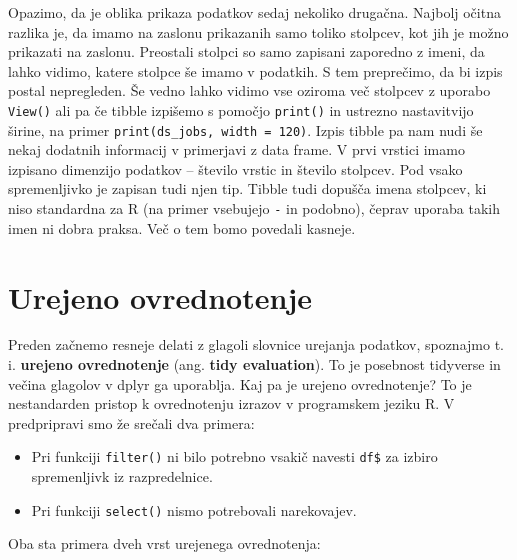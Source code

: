\documentclass[
]{book}
\providecommand{\tightlist}{%
  \setlength{\itemsep}{0pt}\setlength{\parskip}{0pt}}
\begin{document}
Opazimo, da je oblika prikaza podatkov sedaj nekoliko drugačna. Najbolj očitna razlika je, da imamo na zaslonu prikazanih samo toliko stolpcev, kot jih je možno prikazati na zaslonu. Preostali stolpci so samo zapisani zaporedno z imeni, da lahko vidimo, katere stolpce še imamo v podatkih. S tem preprečimo, da bi izpis postal nepregleden. Še vedno lahko vidimo vse oziroma več stolpcev z uporabo \texttt{View()} ali pa če tibble izpišemo s pomočjo \texttt{print()} in ustrezno nastavitvijo širine, na primer \texttt{print(ds\_jobs,\ width\ =\ 120)}. Izpis tibble pa nam nudi še nekaj dodatnih informacij v primerjavi z data frame. V prvi vrstici imamo izpisano dimenzijo podatkov -- število vrstic in število stolpcev. Pod vsako spremenljivko je zapisan tudi njen tip. Tibble tudi dopušča imena stolpcev, ki niso standardna za R (na primer vsebujejo \texttt{-} in podobno), čeprav uporaba takih imen ni dobra praksa. Več o tem bomo povedali kasneje.

\hypertarget{urejeno-ovrednotenje}{%
\section{Urejeno ovrednotenje}\label{urejeno-ovrednotenje}}

Preden začnemo resneje delati z glagoli slovnice urejanja podatkov, spoznajmo t. i. \textbf{urejeno ovrednotenje} (ang. \textbf{tidy evaluation}). To je posebnost tidyverse in večina glagolov v dplyr ga uporablja. Kaj pa je urejeno ovrednotenje? To je nestandarden pristop k ovrednotenju izrazov v programskem jeziku R. V predpripravi smo že srečali dva primera:

\begin{itemize}
\tightlist
\item
  Pri funkciji \texttt{filter()} ni bilo potrebno vsakič navesti \texttt{df\$} za izbiro spremenljivk iz razpredelnice.
\item
  Pri funkciji \texttt{select()} nismo potrebovali narekovajev.
\end{itemize}

Oba sta primera dveh vrst urejenega ovrednotenja:
\end{document}

